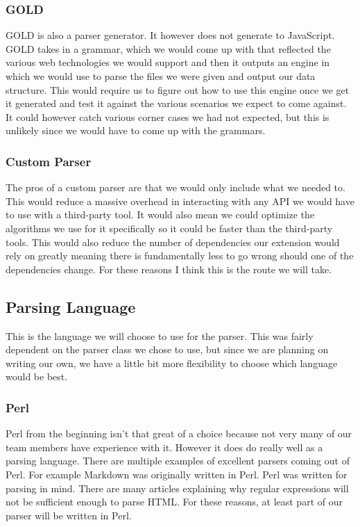 \documentclass[letterpaper,10pt,titlepage,draftclsnofoot,onecolumn,onesided] {IEEEtran}
\begin{document}
\subsubsection{GOLD}
GOLD is also a parser generator.
It however does not generate to JavaScript.
GOLD takes in a grammar, which we would come up with that reflected the various web technologies we would support and then it outputs an engine in which we would use to parse the files we were given and output our data structure.
This would require us to figure out how to use this engine once we get it generated and test it against the various scenarios we expect to come against.
It could however catch various corner cases we had not expected, but this is unlikely since we would have to come up with the grammars.
\cite{gold}

\subsubsection{Custom Parser}
The pros of a custom parser are that we would only include what we needed to.
This would reduce a massive overhead in interacting with any API we would have to use with a third-party tool. 
It would also mean we could optimize the algorithms we use for it specifically so it could be faster than the third-party tools.
This would also reduce the number of dependencies our extension would rely on greatly meaning there is fundamentally less to go wrong should one of the dependencies change.
For these reasons I think this is the route we will take.

\subsection{Parsing Language}
This is the language we will choose to use for the parser.
This was fairly dependent on the parser class we chose to use, but since we are planning on writing our own, we have a little bit more flexibility to choose which language would be best.

\subsubsection{Perl}
Perl from the beginning isn't that great of a choice because not very many of our team members have experience with it.
However it does do really well as a parsing language.
There are multiple examples of excellent parsers coming out of Perl. 
For example Markdown\cite{markdown} was originally written in Perl.
Perl was written for parsing in mind.
There are many articles explaining why regular expressions will not be sufficient enough to parse HTML.\cite{oreilly}
For these reasons, at least part of our parser will be written in Perl.
\end{document}
